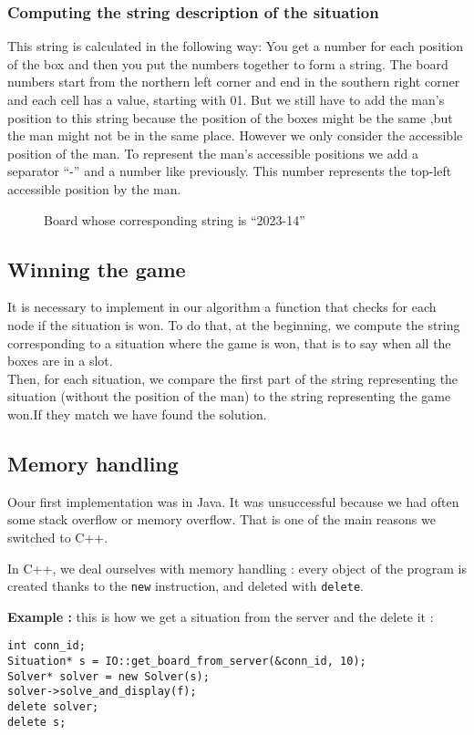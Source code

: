\documentclass[journal]{IEEEtran}
\newcommand{\imageWithoutFigure}[2] { %
\fbox {\imageWithoutFigureAndBox{#1}{#2} }
}
\newcommand{\imageWithoutFigureAndBox}[2] { %
\texttt{[image: ./images/\#1.png]}
}
\newcommand{\Figure}[3] { %
\begin{figure}[!ht]
\centering{#1}
\caption{#2
\label{#3}
}
\end{figure}
}
\newcommand{\image}[4] { %
\Figure{\imageWithoutFigure{#1}{#2}} {#3} {#4}
}
\begin{document}
\subsubsection{Computing the string description of the situation}
This string is calculated in the following way: You get a number for each position of the box and then you put the numbers together to form a string.
The board numbers start from the northern left corner and end in the southern right corner and each cell has a value, starting with 01. But we still have to add the man's position to this string because the position of the boxes might be the same ,but the man might not be in the same place. However we only consider the accessible position of the man. To represent the man's accessible positions we add a separator ``-'' and a number like previously. This number represents the top-left accessible position by the man.
\image
    {string_description}
    {4.5}
    {Board whose corresponding string is ``2023-14''}
    {fig:forbidden}

\subsection{Winning the game}
It is necessary to implement in our algorithm a function that checks for each node if the situation is won. To do that, at the beginning, we compute the string corresponding to a situation where the game is won, that is to say when all the boxes are in a slot.
\\
Then, for each situation, we compare the first part of the string representing the situation (without the position of the man) to the string representing the game won.If they match we have found the solution.

\subsection{Memory handling}
Oour first implementation was in Java.
It was unsuccessful because we had often some stack overflow or memory overflow.
That is one of the main reasons we switched to C++.

In C++, we deal ourselves with memory handling : every object of the program is created thanks to the \verb|new| instruction,
and deleted with \verb|delete|.

\textbf{Example : } this is how we get a situation from the server and the delete it :
\begin{verbatim}
int conn_id;
Situation* s = IO::get_board_from_server(&conn_id, 10);
Solver* solver = new Solver(s);
solver->solve_and_display(f);
delete solver;
delete s;
\end{verbatim}
\end{document}
